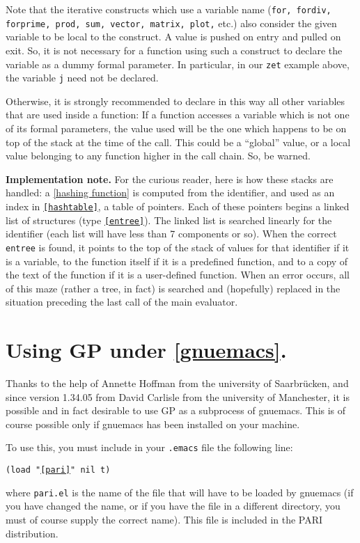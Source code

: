 Note that the iterative constructs which use a variable name ({\tt for, fordiv,
forprime, prod, sum, vector, matrix, plot,} etc.) also consider the given
variable to be local to the construct. A value is pushed on entry and pulled on
exit. So, it is not necessary for a function using such a construct to declare
the variable as a dummy formal parameter. In particular, in our {\tt zet}
example above, the variable {\tt j} need not be declared.

Otherwise, it is strongly recommended to declare in this way all other variables that are used
inside a function: If a function accesses a variable which is not one of its
formal parameters, the value used will be the one which happens to be on top of
the stack at the time of the call. This could be a ``global'' value, or a local
value belonging to any function higher in the call chain. So, be warned.

{\bf Implementation note.} For the curious reader, here is how these stacks are
handled: a \ref{hashing function} is computed from the identifier, and used as an
index in {\tt \ref{hashtable}}, a table of pointers. Each of these pointers begins
a linked list of structures (type {\tt \ref{entree}}). The linked list is searched
linearly for the identifier (each list will have less than 7 components or
so). When the correct {\tt entree} is found, it points to the top of the
stack of values for that identifier if it is a variable, to the function
itself if it is a predefined function, and to a copy of the text of the
function if it is a user-defined function. When an error occurs, all of this
maze (rather a tree, in fact) is searched and (hopefully) replaced in the
situation preceding the last call of the main evaluator.

\section{Using GP under \ref{gnuemacs}.}

Thanks to the help of Annette Hoffman from the university of Saarbr\"ucken, 
and since version 1.34.05 from David Carlisle from the university of
Manchester, it is possible and in fact desirable to use GP as a subprocess of
gnuemacs. This is of course possible only if gnuemacs has been installed on 
your machine.

To use this, you must include in your {\tt .emacs} file the following line:

{\tt (load "\ref{pari}" nil t)}

where {\tt pari.el} is the name of the file that will have to be loaded by gnuemacs
(if you have changed the name, or if you have the file in a different directory, you
must of course supply the correct name). This file is included in the PARI distribution.


